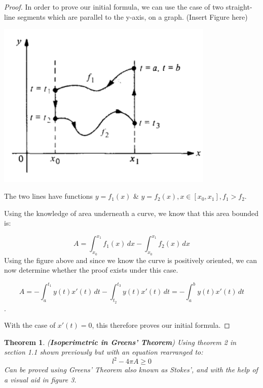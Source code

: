 \documentclass[a4paper]{book}
\newtheorem{theorem}{Theorem}%
\begin{document}
\begin{proof} 
    In order to prove our initial formula, we can use the case of two straight-line segments which are parallel to the y-axis, on a graph. (Insert Figure here)

    \begin{center}
      \includegraphics[height=80mm]{Initial Formula Proof Graph.png}
    \end{center}

    The two lines have functions $y=f_1(x)$ \& $y=f_2(x), x\in[x_0,x_1], f_1>f_2$.

    Using the knowledge of area underneath a curve, we know that this area bounded is:

    \[ A =\int_{x_0}^{x_1} f_1(x) \, dx - \int_{x_0}^{x_1} f_2(x) \, dx \]
    Using the figure above and since we know the curve is positively oriented, we can now determine whether the proof exists under this case.

    \[ A =-\int_{a}^{t_1} y(t)x'(t) \, dt - \int_{t_2}^{t_3} y(t)x'(t) \, dt = -\int_{a}^{b} y(t)x'(t) \, dt \].

    With the case of $x'(t)=0$, this therefore proves our initial formula.  
\end{proof}

\begin{theorem}(\textbf{Isoperimetric in Greens' Theorem})
    Using theorem 2 in section 1.1 shown previously but with an equation rearranged to:
    \[l^2 -4\pi A\geqslant 0\]
    Can be proved using Greens' Theorem also known as Stokes', and with the help of a visual aid in figure 3.
\end{theorem}
\end{document}
